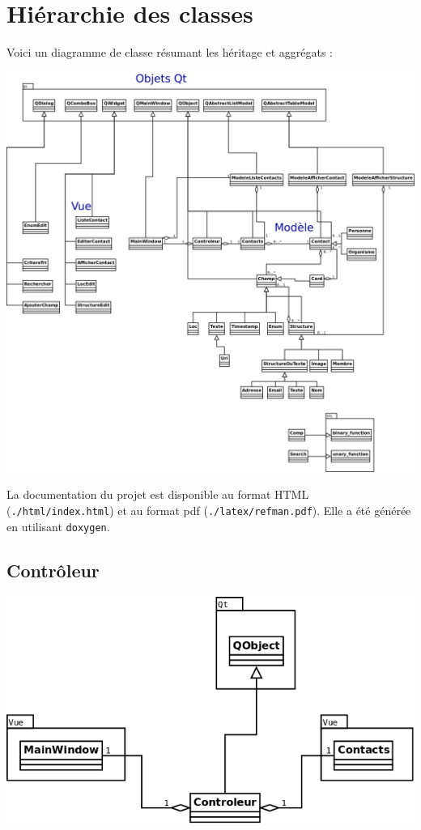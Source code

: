 \documentclass[a4paper,12pt]{report}
\begin{document}
\chapter{Hiérarchie des classes}
\par
Voici un diagramme de classe résumant les héritage et aggrégats :
\par
\includegraphics[scale=0.2]{../dia/ClassDiagram.png}
\par
La documentation du projet est disponible au format HTML (\texttt{./html/index.html}) et au format pdf (\texttt{./latex/refman.pdf}).
Elle a été générée en utilisant \texttt{doxygen}.

\section{Contrôleur}

\includegraphics[scale=0.35]{../dia/ClassDiagramControler.png}
\end{document}
